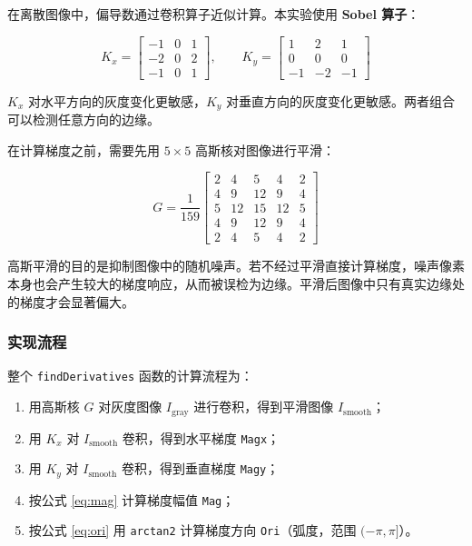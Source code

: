 \documentclass[12pt,a4paper]{ctexart}
\begin{document}
在离散图像中，偏导数通过卷积算子近似计算。本实验使用 \textbf{Sobel 算子}：

\begin{equation}
  K_x = \begin{bmatrix} -1 & 0 & 1 \\ -2 & 0 & 2 \\ -1 & 0 & 1 \end{bmatrix}, \qquad
  K_y = \begin{bmatrix} 1 & 2 & 1 \\ 0 & 0 & 0 \\ -1 & -2 & -1 \end{bmatrix}
\end{equation}

$K_x$ 对水平方向的灰度变化更敏感，$K_y$ 对垂直方向的灰度变化更敏感。两者组合可以检测任意方向的边缘。

在计算梯度之前，需要先用 $5 \times 5$ 高斯核对图像进行平滑：

\begin{equation}
  G = \frac{1}{159} \begin{bmatrix} 2 & 4 & 5 & 4 & 2 \\ 4 & 9 & 12 & 9 & 4 \\ 5 & 12 & 15 & 12 & 5 \\ 4 & 9 & 12 & 9 & 4 \\ 2 & 4 & 5 & 4 & 2 \end{bmatrix}
\end{equation}

高斯平滑的目的是抑制图像中的随机噪声。若不经过平滑直接计算梯度，噪声像素本身也会产生较大的梯度响应，从而被误检为边缘。平滑后图像中只有真实边缘处的梯度才会显著偏大。

\subsubsection{实现流程}

整个 \texttt{findDerivatives} 函数的计算流程为：

\begin{enumerate}
  \item 用高斯核 $G$ 对灰度图像 $I_\text{gray}$ 进行卷积，得到平滑图像 $I_\text{smooth}$；
  \item 用 $K_x$ 对 $I_\text{smooth}$ 卷积，得到水平梯度 \texttt{Magx}；
  \item 用 $K_y$ 对 $I_\text{smooth}$ 卷积，得到垂直梯度 \texttt{Magy}；
  \item 按公式 \eqref{eq:mag} 计算梯度幅值 \texttt{Mag}；
  \item 按公式 \eqref{eq:ori} 用 \texttt{arctan2} 计算梯度方向 \texttt{Ori}（弧度，范围 $(-\pi, \pi]$）。
\end{enumerate}
\end{document}

